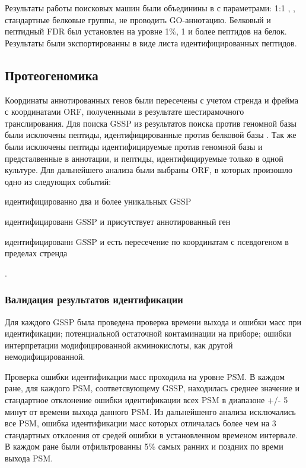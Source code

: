 Результаты работы поисковых машин были объединины в  с параметрами: 1:1 , , стандартные белковые группы, не проводить GO-аннотацию. Белковый и пептидный FDR был установлен на уровне 1\%, 1 и более пептидов на белок. Результаты были экспортированны в виде листа идентифицированных пептидов.

\subsection{Протеогеномика }
Координаты аннотированных генов были пересечены с учетом стренда и фрейма с координатами ORF, полученными в результате шестирамочного транслирования.
Для поиска GSSP из результатов поиска против геномной базы  были исключены пептиды, идентифицированные против белковой базы . Так же были исключены пептиды идентифицируемые против геномной базы и предсталвенные в аннотации, и пептиды, идентифицируемые только в одной культуре. Для дальнейшего анализа были выбраны ORF, в которых произошло одно из следующих событий:
\begin{inparaenum}
    \item идентифицированно два и более уникальных GSSP
    \item идентифицированн GSSP и присутствует аннотированный ген
    \item идентифицированн GSSP и есть пересечение по координатам с псевдогеном в пределах стренда
\end{inparaenum}.

\subsubsection{Валидация результатов идентификации}
Для каждого GSSP была проведена проверка времени выхода и ошибки масс при идентификации; потенциальной остаточной контаминации на приборе; ошибки интерпретации модифицированной акминокислоты, как другой немодифицированной.

Проверка ошибки идентификации масс проходила на уровне PSM. В каждом ране, для каждого PSM, соответсвующему GSSP, находилась среднее значение и стандартное отклонение ошибки идентификации всех PSM в диапазоне +/- 5 минут от времени выхода данного PSM. Из дальнейшенго анализа исключались все PSM, ошибка идентификации масс которых отличалась более чем на 3 стандартных отклоения от средей ошибки в установленном временом интервале. В каждом ране были отфильтрованны 5\% самых ранних и поздних по времи выхода PSM.

